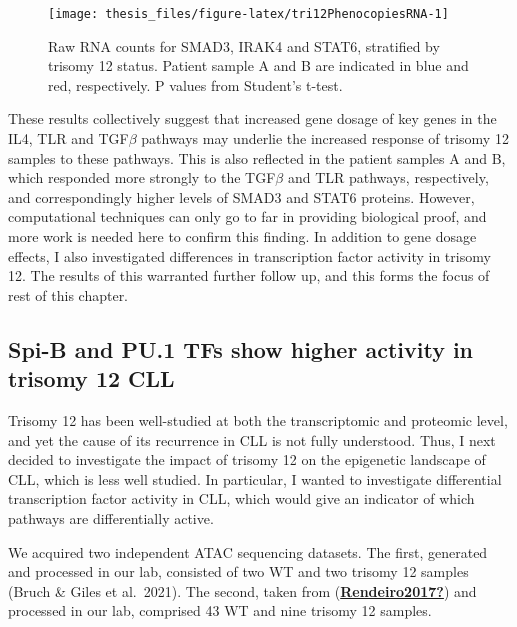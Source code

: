 \documentclass[11pt, a4paper, twosided]{book}
\begin{document}
\begin{figure}

{\centering \texttt{[image: thesis\_files/figure-latex/tri12PhenocopiesRNA-1]} 

}

\caption{Raw RNA counts for SMAD3, IRAK4 and STAT6, stratified by trisomy 12 status. Patient sample A and B are indicated in blue and red, respectively. P values from Student's t-test.}\label{fig:tri12PhenocopiesRNA}
\end{figure}
These results collectively suggest that increased gene dosage of key genes in the IL4, TLR and TGF\(\beta\) pathways may underlie the increased response of trisomy 12 samples to these pathways. This is also reflected in the patient samples A and B, which responded more strongly to the TGF\(\beta\) and TLR pathways, respectively, and correspondingly higher levels of SMAD3 and STAT6 proteins. However, computational techniques can only go to far in providing biological proof, and more work is needed here to confirm this finding. In addition to gene dosage effects, I also investigated differences in transcription factor activity in trisomy 12. The results of this warranted further follow up, and this forms the focus of rest of this chapter.

\hypertarget{spi-b-and-pu.1-tfs-show-higher-activity-in-trisomy-12-cll}{%
\subsection{Spi-B and PU.1 TFs show higher activity in trisomy 12 CLL}\label{spi-b-and-pu.1-tfs-show-higher-activity-in-trisomy-12-cll}}

Trisomy 12 has been well-studied at both the transcriptomic and proteomic level, and yet the cause of its recurrence in CLL is not fully understood. Thus, I next decided to investigate the impact of trisomy 12 on the epigenetic landscape of CLL, which is less well studied. In particular, I wanted to investigate differential transcription factor activity in CLL, which would give an indicator of which pathways are differentially active.

We acquired two independent ATAC sequencing datasets. The first, generated and processed in our lab, consisted of two WT and two trisomy 12 samples (Bruch \& Giles et al.~2021). The second, taken from (\protect\hyperlink{ref-Rendeiro2017}{\textbf{Rendeiro2017?}}) and processed in our lab, comprised 43 WT and nine trisomy 12 samples.
\end{document}

